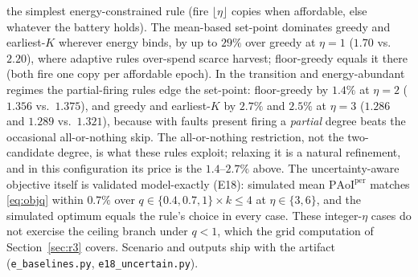 \documentclass[twocolumn,3p,times,procedia]{elsarticle}
\theoremstyle{plain}
\theoremstyle{remark}
\newcommand{\PAoIper}{\mathrm{PAoI}^{\mathrm{per}}}
\begin{document}
the simplest energy-constrained rule (fire $\lfloor\eta\rfloor$ copies
when affordable, else whatever the battery holds). The mean-based
set-point dominates greedy and earliest-$K$ wherever energy binds, by
up to $29\%$ over greedy at $\eta{=}1$ ($1.70$ vs.\ $2.20$), where
adaptive rules over-spend scarce harvest; floor-greedy equals it
there (both fire one copy per affordable epoch). In the transition and
energy-abundant regimes the partial-firing rules edge the set-point:
floor-greedy by $1.4\%$ at $\eta{=}2$ ($1.356$ vs.\ $1.375$), and greedy
and earliest-$K$ by $2.7\%$ and $2.5\%$ at $\eta{=}3$ ($1.286$ and
$1.289$ vs.\ $1.321$), because with faults present firing a
\emph{partial} degree beats the occasional all-or-nothing skip. The
all-or-nothing restriction, not the two-candidate degree, is what these
rules exploit; relaxing it is a natural refinement, and in this
configuration its price is the $1.4$--$2.7\%$ above. The
uncertainty-aware objective itself is validated model-exactly (E18):
simulated mean $\PAoIper$ matches \eqref{eq:objq} within $0.7\%$ over
$q\in\{0.4,0.7,1\}\times k\le4$ at $\eta\in\{3,6\}$, and the simulated
optimum equals the rule's choice in every case. These integer-$\eta$
cases do not exercise the ceiling branch under $q<1$, which the grid
computation of Section~\ref{sec:r3} covers. Scenario and
outputs ship with the artifact (\texttt{e\_baselines.py},
\texttt{e18\_uncertain.py}).
\end{document}
